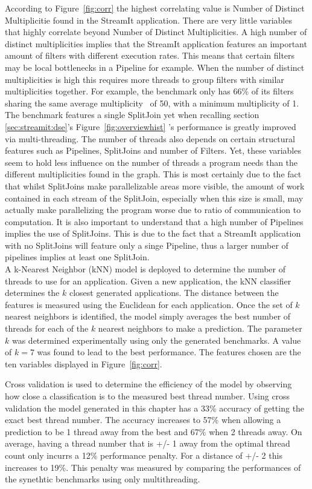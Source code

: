 According to Figure~\ref{fig:corr} the highest correlating value is Number of Distinct Multiplicitie found in the StreamIt application.
There are very little variables that highly correlate beyond Number of Distinct Multiplicities.
A high number of distinct multiplicities implies that the StreamIt application features an important amount of filters with different execution rates.
This means that certain filters may be local bottlenecks in a Pipeline for example.
When the number of distinct multiplicities is high this requires more threads to group filters with similar multiplicities together.
For example, the benchmark  only has 66\% of its filters sharing the same average multiplicity~\cite{theis2010empericalcharstreamit} of 50, with a minimum multiplicity of 1. 
The benchmark features a single SplitJoin yet when recalling section \ref{sec:streamit:dse}'s Figure~\ref{fig:overviewhist} 's performance is greatly improved via multi-threading.
The number of threads also depends on certain structural features such as Pipelines, SplitJoins and number of Filters.
Yet, these variables seem to hold less influence on the number of threads a program needs than the different multiplicities found in the graph.
This is most certainly due to the fact that whilst SplitJoins make parallelizable areas more visible, the amount of work contained in each stream of the SplitJoin, especially when this size is small, may actually make parallelizing the program worse due to ratio of communication to computation.
It is also important to understand that a high number of Pipelines implies the use of SplitJoins.
This is due to the fact that a StreamIt application with no SplitJoins will feature only a singe Pipeline, thus a larger number of pipelines implies at least one SplitJoin.\\

A k-Nearest Neighbor (kNN) model is deployed to determine the number of threads to use for an application.
Given a new application, the kNN classifier determines the $k$ closest generated applications.
The distance between the features is measured using the Euclidean for each application.
Once the set of $k$ nearest neighbors is identified, the model simply averages the best number of threads for each of the $k$ nearest neighbors to make a prediction.
The parameter $k$ was determined experimentally using only the generated benchmarks.
A value of $k=7$ was found to lead to the best performance.
The features chosen are the ten variables displayed in Figure~\ref{fig:corr}.

Cross validation is used to determine the efficiency of the model by observing how close a classification is to the measured best thread number.
Using cross validation the model generated in this chapter has a 33\% accuracy of getting the exact best thread number.
The accuracy increases to 57\% when allowing a prediction to be 1 thread away from the best and 67\% when 2 threads away.
On average, having a thread number that is +/- 1 away from the optimal thread count only incurrs a 12\% performance penalty.
For a distance of +/- 2 this increases to 19\%.
This penalty was measured by comparing the performances of the synethtic benchmarks using only multithreading.


